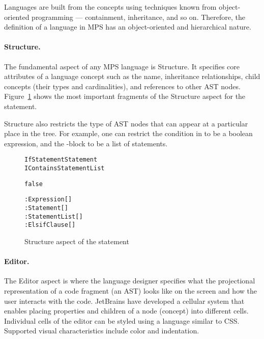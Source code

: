 Languages are built from the concepts using techniques known from object-oriented programming --- containment, inheritance, and so on.
Therefore, the definition of a language in MPS has an object-oriented and hierarchical nature.

\paragraph{Structure.}
The fundamental aspect of any MPS language is Structure.
It specifies core attributes of a language concept such as the name, inheritance relationships, child concepts (their types and cardinalities), and references to other AST nodes.
Figure~\ref{fig:if_statement_structure} shows the most important fragments of the Structure aspect for the  statement.

Structure also restricts the type of AST nodes that can appear at a particular place in the tree.
For example, one can restrict the condition in  to be a boolean expression, and the -block to be a list of statements.

\begin{figure}[ht]
\vspace{-2mm}
\centering
\begin{alltt}
\small
{} IfStatement  Statement
         IContainsStatementList

   false
   

          : Expression[]
   : Statement[]
             : StatementList[]
       : ElsifClause[]
\end{alltt}
\caption{Structure aspect of the  statement}
\label{fig:if_statement_structure}
\vspace{-4mm}
\end{figure}

\paragraph{Editor.}
The Editor aspect is where the language designer specifies what the projectional representation of a code fragment (an AST) looks like on the screen and how the user interacts with the code.
JetBrains have developed a cellular system that enables placing properties and children of a node (concept) into different cells.
Individual cells of the editor can be styled using a language similar to CSS.
Supported visual characteristics include color and indentation.

